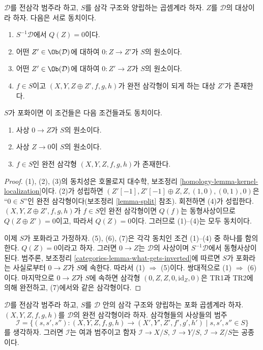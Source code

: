\begin{lemma}
\label{lemma-kernel-localization}
$\mathcal{D}$를 전삼각 범주라 하고, $S$를 삼각 구조와 양립하는
곱셈계라 하자. $Z$를 $\mathcal{D}$의 대상이라 하자.
다음은 서로 동치이다.
\begin{enumerate}
\item $S^{-1}\mathcal{D}$에서 $Q(Z) = 0$이다.
\item 어떤 $Z' \in \Ob(\mathcal{D})$에 대하여
$0 : Z \to Z'$가 $S$의 원소이다.
\item 어떤 $Z' \in \Ob(\mathcal{D})$에 대하여
$0 : Z' \to Z$가 $S$의 원소이다.
\item $f \in S$이고 $(X, Y, Z \oplus Z', f, g, h)$가 완전 삼각형이
되게 하는 대상 $Z'$가 존재한다.
\end{enumerate}
$S$가 포화이면 이 조건들은 다음 조건들과도 동치이다.
\begin{enumerate}
\item[(5)] 사상 $0 \to Z$가 $S$의 원소이다.
\item[(6)] 사상 $Z \to 0$이 $S$의 원소이다.
\item[(7)] $f \in S$인 완전 삼각형 $(X, Y, Z, f, g, h)$가 존재한다.
\end{enumerate}
\end{lemma}

\begin{proof}
(1), (2), (3)의 동치성은 호몰로지 대수학, 보조정리
\ref{homology-lemma-kernel-localization}이다.
(2)가 성립하면 $(Z'[-1], Z'[-1] \oplus Z, Z, (1, 0), (0, 1), 0)$은
“$0 \in S$”인 완전 삼각형이다(보조정리 \ref{lemma-split} 참조).
회전하면 (4)가 성립한다. $(X, Y, Z \oplus Z', f, g, h)$가
$f \in S$인 완전 삼각형이면 $Q(f)$는 동형사상이므로
$Q(Z \oplus Z') = 0$이고, 따라서 $Q(Z) = 0$이다.
그러므로 (1)--(4)는 모두 동치이다.

\medskip\noindent
이제 $S$가 포화라고 가정하자. (5), (6), (7)은 각각 동치인
조건 (1)--(4) 중 하나를 함의한다. $Q(Z) = 0$이라고 하자.
그러면 $0 \to Z$는 $\mathcal{D}$의 사상이며
$S^{-1}\mathcal{D}$에서 동형사상이 된다. 범주론, 보조정리
\ref{categories-lemma-what-gets-inverted}에 따르면 $S$가 포화라는
사실로부터 $0 \to Z$가 $S$에 속한다. 따라서 (1) $\Rightarrow$ (5)이다.
쌍대적으로 (1) $\Rightarrow$ (6)이다. 마지막으로
$0 \to Z$가 $S$에 속하면 삼각형
$(0, Z, Z, 0, \text{id}_Z, 0)$은 TR1과 TR2에 의해 완전하고,
(7)에서와 같은 삼각형이다.
\end{proof}

\begin{lemma}
\label{lemma-limit-triangles}
$\mathcal{D}$를 전삼각 범주라 하고, $S$를 $\mathcal{D}$ 안의 삼각
구조와 양립하는 포화 곱셈계라 하자.
$(X, Y, Z, f, g, h)$를 $\mathcal{D}$의 완전 삼각형이라 하자.
삼각형들의 사상들의 범주
$$
\mathcal{I} =
\{(s, s', s'') : (X, Y, Z, f, g, h) \to (X', Y', Z', f', g', h')
\mid s, s', s'' \in S\}
$$
를 생각하자. 그러면 $\mathcal{I}$는 여과 범주이고 함자
$\mathcal{I} \to X/S$, $\mathcal{I} \to Y/S$, $\mathcal{I} \to Z/S$는
공종이다.
\end{lemma}


